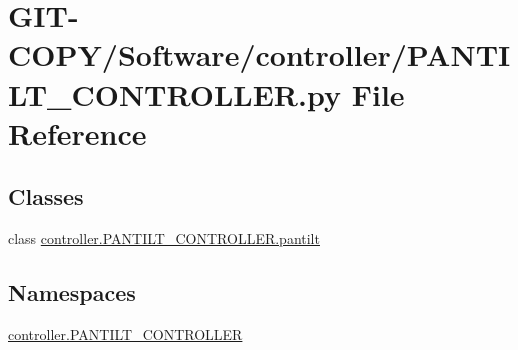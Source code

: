 \hypertarget{GIT-COPY_2Software_2controller_2PANTILT__CONTROLLER_8py}{}\section{G\+I\+T-\/\+C\+O\+P\+Y/\+Software/controller/\+P\+A\+N\+T\+I\+L\+T\+\_\+\+C\+O\+N\+T\+R\+O\+L\+L\+E\+R.py File Reference}
\label{GIT-COPY_2Software_2controller_2PANTILT__CONTROLLER_8py}
\subsection*{Classes}
\begin{DoxyCompactItemize}
\item 
class \hyperlink{classcontroller_1_1PANTILT__CONTROLLER_1_1pantilt}{controller.\+P\+A\+N\+T\+I\+L\+T\+\_\+\+C\+O\+N\+T\+R\+O\+L\+L\+E\+R.\+pantilt}
\end{DoxyCompactItemize}
\subsection*{Namespaces}
\begin{DoxyCompactItemize}
\item 
 \hyperlink{namespacecontroller_1_1PANTILT__CONTROLLER}{controller.\+P\+A\+N\+T\+I\+L\+T\+\_\+\+C\+O\+N\+T\+R\+O\+L\+L\+E\+R}
\end{DoxyCompactItemize}
